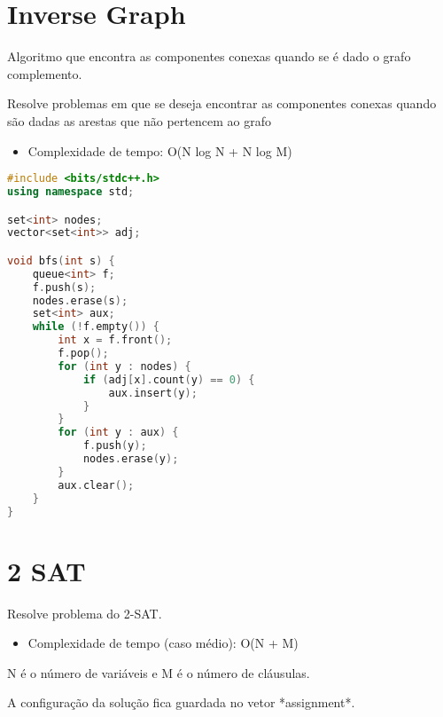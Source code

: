 \documentclass[11pt, a4paper, oneside]{book}
\begin{document}
\hfill

\section{Inverse Graph}


Algoritmo que encontra as componentes conexas quando se é dado o grafo complemento.



Resolve problemas em que se deseja encontrar as componentes conexas quando são dadas as arestas que não pertencem ao grafo



\begin{itemize}
\item Complexidade de tempo: O(N log N + N log M)
\end{itemize}

\hfill

\begin{multicols}{2}
\begin{lstlisting}[language=C++]
#include <bits/stdc++.h>
using namespace std;

set<int> nodes;
vector<set<int>> adj;

void bfs(int s) {
    queue<int> f;
    f.push(s);
    nodes.erase(s);
    set<int> aux;
    while (!f.empty()) {
        int x = f.front();
        f.pop();
        for (int y : nodes) {
            if (adj[x].count(y) == 0) {
                aux.insert(y);
            }
        }
        for (int y : aux) {
            f.push(y);
            nodes.erase(y);
        }
        aux.clear();
    }
}
\end{lstlisting}
\end{multicols}

\hfill

\section{2 SAT}


Resolve problema do 2-SAT.



\begin{itemize}
\item Complexidade de tempo (caso médio): O(N + M)
\end{itemize}



N é o número de variáveis e M é o número de cláusulas.  

A configuração da solução fica guardada no vetor *assignment*. 
\end{document}
